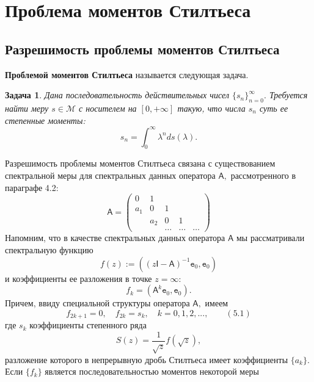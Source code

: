 \documentclass[12 pt, a4 paper]{article}
\theoremstyle{plain}   \newtheorem{Pro}{Задача}
\begin{document}
\section{Проблема моментов Стилтьеса}
\subsection{Разрешимость проблемы моментов Стилтьеса}
{\bfseries Проблемой моментов Стилтьеса}
называется следующая задача.
\begin{Pro}
Дана последовательность действительных чисел
$ \{ s_n \} _{n=0}^{\infty} . $
Требуется найти меру
$ s \in \mathcal{M} $
с носителем на
$ [0,+\infty] $
такую, что числа
$ s_n $
суть ее степенные моменты:
\begin{equation*}
  s_n =\int _0 ^{\infty} \lambda ^n ds( \lambda ).
\end{equation*}
\end{Pro}
Разрешимость проблемы моментов Стилтьеса связана с
существованием спектральной меры для спектральных данных
оператора
$ \mathsf{A} , $
рассмотренного в параграфе 4.2:
\begin{equation*}
  \mathsf{A}=
    \begin{pmatrix}
	  0 & 1 & \; & \; & \; \; \\
	  a_1 & 0 & 1 & \; & \; \; \\
	  \; & a_2 & 0 & 1 & \; \; \\
	  \; & \; & \dots & \dots & \dots
	\end{pmatrix}
\end{equation*}
Напомним, что в качестве спектральных данных оператора
$ \mathsf{A} $
мы рассматривали спектральную функцию
$$
  f(z):=((z \mathsf{I}-\mathsf{A})^{-1}
    \mathtt{e}_0 ,\mathtt{e}_0 )
$$
и коэффициенты ее разложения в точке
$ z=\infty : $
$$
  f_k =(\mathsf{A}^k \mathtt{e}_0 , \mathtt{e}_0 ).
$$
Причем, ввиду специальной структуры оператора
$ \mathsf{A} , $
имеем
$$
  f_{2k+1}=0, \quad f_{2k}=s_k , \quad
     k=0,1,2,..., \qquad (5.1)
$$
где
$ s_k $
коэффициенты степенного ряда
$$
  S(z)=\frac{1}{\sqrt{z}}f(\sqrt{z}),
$$
разложение которого в непрерывную дробь Стилтьеса
имеет коэффициенты
$ \{ a_k \} . $
Если
$ \{ f_k \} $
является последовательностью моментов некоторой меры
\end{document}
